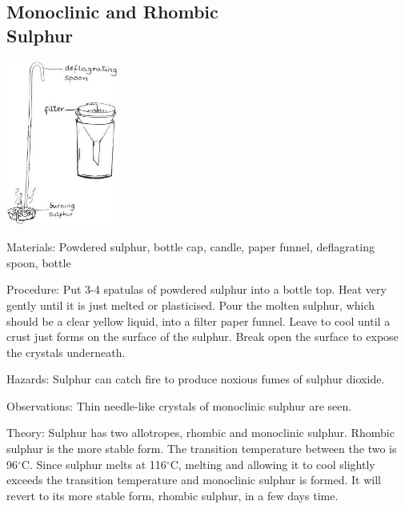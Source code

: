 \begin{multicols}{2}
\subsection{Monoclinic and Rhombic \hfill \\ Sulphur}

\begin{center}
\includegraphics[width=0.28\textwidth]{./img/source/sulphur-monoclinic.jpg}
\end{center}

\begin{description*}
\item[Materials:]{Powdered sulphur, bottle cap, candle, paper funnel, deflagrating spoon, bottle}
\item[Procedure:]{Put 3-4 spatulas of powdered sulphur into a
bottle top. Heat very
gently until it is just melted or plasticised. Pour the
molten sulphur, which should be a clear yellow
liquid, into a filter paper funnel. Leave
to cool until a crust just forms on the
surface of the sulphur. Break open the surface to
expose the crystals underneath.}
\item[Hazards:]{Sulphur can catch fire to produce noxious
fumes of sulphur dioxide.}
\item[Observations:]{Thin needle-like crystals of monoclinic
sulphur are seen.}
\item[Theory:]{Sulphur has two allotropes, rhombic and
monoclinic sulphur. Rhombic sulphur is the
more stable form. The transition temperature
between the two is 96$^\circ$C. Since sulphur
melts at 116$^\circ$C, melting and
allowing it to cool slightly exceeds the transition
temperature and monoclinic sulphur
is formed. It will revert to its
more stable form, rhombic sulphur, in a few
days time.}
\end{description*}


\end{multicols}
